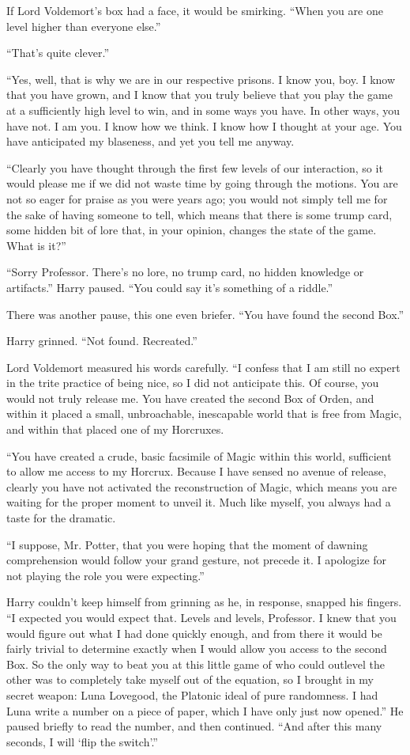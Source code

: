 If Lord Voldemort’s box had a face, it would be smirking. “When you are one level higher than everyone else.”

“That’s quite clever.”

“Yes, well, that is why we are in our respective prisons. I know you, boy. I know that you have grown, and I know that you truly believe that you play the game at a sufficiently high level to win, and in some ways you have. In other ways, you have not. I am you. I know how we think. I know how I thought at your age. You have anticipated my blaseness, and yet you tell me anyway.

“Clearly you have thought through the first few levels of our interaction, so it would please me if we did not waste time by going through the motions. You are not so eager for praise as you were years ago; you would not simply tell me for the sake of having someone to tell, which means that there is some trump card, some hidden bit of lore that, in your opinion, changes the state of the game. What is it?”

“Sorry Professor. There’s no lore, no trump card, no hidden knowledge or artifacts.” Harry paused. “You could say it’s something of a riddle.”

There was another pause, this one even briefer. “You have found the second Box.”

Harry grinned. “Not found. Recreated.”

Lord Voldemort measured his words carefully. “I confess that I am still no expert in the trite practice of being nice, so I did not anticipate this. Of course, you would not truly release me. You have created the second Box of Orden, and within it placed a small, unbroachable, inescapable world that is free from Magic, and within that placed one of my Horcruxes.

“You have created a crude, basic facsimile of Magic within this world, sufficient to allow me access to my Horcrux. Because I have sensed no avenue of release, clearly you have not activated the reconstruction of Magic, which means you are waiting for the proper moment to unveil it. Much like myself, you always had a taste for the dramatic.

“I suppose, Mr. Potter, that you were hoping that the moment of dawning comprehension would follow your grand gesture, not precede it. I apologize for not playing the role you were expecting.”

Harry couldn’t keep himself from grinning as he, in response, snapped his fingers. “I expected you would expect that. Levels and levels, Professor. I knew that you would figure out what I had done quickly enough, and from there it would be fairly trivial to determine exactly when I would allow you access to the second Box. So the only way to beat you at this little game of who could outlevel the other was to completely take myself out of the equation, so I brought in my secret weapon: Luna Lovegood, the Platonic ideal of pure randomness. I had Luna write a number on a piece of paper, which I have only just now opened.” He paused briefly to read the number, and then continued. “And after this many seconds, I will ‘flip the switch’.”

